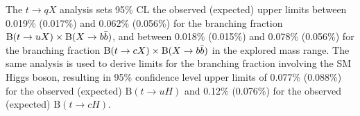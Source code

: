 The $t\to qX$ analysis sets 95\% CL the observed (expected) upper limits between 0.019\% (0.017\%) and 0.062\% (0.056\%) for the branching fraction $\text{B}(t\to uX)\times\text{B}(X\to b\bar{b})$, and between 0.018\% (0.015\%) and 0.078\% (0.056\%) for the branching fraction $\text{B}(t\to cX)\times\text{B}(X\to b\bar{b})$ in the explored mass range. The same analysis is used to derive limits for the branching fraction involving the SM Higgs boson, resulting in 95\% confidence level upper limits of 0.077\% (0.088\%) for the observed (expected) $\text{B}(t\to uH)$ and 0.12\% (0.076\%) for the observed (expected) $\text{B}(t\to cH)$.


